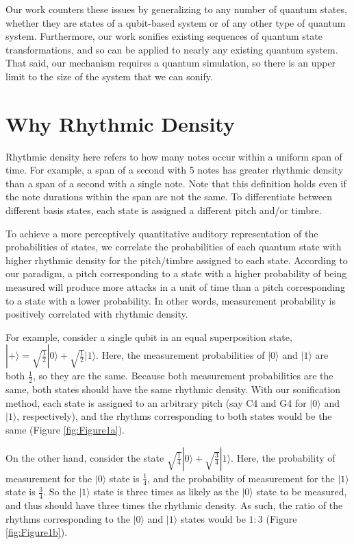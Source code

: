 \documentclass[10pt,twocolumn]{article}
\begin{document}
Our work counters these issues by generalizing to any number of quantum states, whether they are states of a qubit-based system or of any other type of quantum system. Furthermore, our work sonifies existing sequences of quantum state transformations, and so can be applied to nearly any existing quantum system. That said, our mechanism requires a quantum simulation, so there is an upper limit to the size of the system that we can sonify.

\section{Why Rhythmic Density} \label{sec:Why Rhythmic Density}

Rhythmic density here refers to how many notes occur within a uniform span of time. For example, a span of a second with 5 notes has greater rhythmic density than a span of a second with a single note. Note that this definition holds even if the note durations within the span are not the same. To differentiate between different basis states, each state is assigned a different pitch and/or timbre.

To achieve a more perceptively quantitative auditory representation of the probabilities of states, we correlate the probabilities of each quantum state with higher rhythmic density for the pitch/timbre assigned to each state. According to our paradigm, a pitch corresponding to a state with a higher probability of being measured will produce more attacks in a unit of time than a pitch corresponding to a state with a lower probability. In other words, measurement probability is positively correlated with rhythmic density.

For example, consider a single qubit in an equal superposition state, $|+\rangle = \sqrt{\frac{1}{2}}|0\rangle + \sqrt{\frac{1}{2}}|1\rangle$. Here, the measurement probabilities of $|0\rangle$ and $|1\rangle$ are both $\frac{1}{2}$, so they are the same. Because both measurement probabilities are the same, both states should have the same rhythmic density. With our sonification method, each state is assigned to an arbitrary pitch (say C4 and G4 for $|0\rangle$ and $|1\rangle$, respectively), and the rhythms corresponding to both states would be the same (Figure \ref{fig:Figure1a}).

On the other hand, consider the state $\sqrt{\frac{1}{4}}|0\rangle + \sqrt{\frac{3}{4}}|1\rangle$. Here, the probability of measurement for the $|0\rangle$ state is $\frac{1}{4}$, and the probability of measurement for the $|1\rangle$ state is $\frac{3}{4}$. So the $|1\rangle$ state is three times as likely as the $|0\rangle$ state to be measured, and thus should have three times the rhythmic density.  As such, the ratio of the rhythms corresponding to the $|0\rangle$ and $|1\rangle$ states would be $1:3$ (Figure \ref{fig:Figure1b}).
\end{document}
